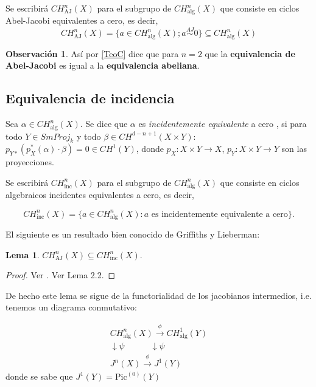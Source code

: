 \documentclass[10pt]{amsart}
\theoremstyle{definition}
\newtheorem{obs}[definition]{Observaci\'on}
\newtheorem{lemma}[definition]{Lema}
\theoremstyle{remark}
\theoremstyle{definition}
\begin{document}
Se escribirá $CH^{n}_{\mathrm{AJ}}(X)$ para el subgrupo de $CH^{n}_{\mathrm{alg}}(X)$ que consiste en ciclos Abel-Jacobi equivalentes a cero, es decir, 
\[ CH_{\mathrm{AJ}}^n(X) = \{ a \in CH^{n}_{\mathrm{alg}}(X); a \stackrel{AJ}{\sim} 0 \} \subseteq CH^{n}_{\mathrm{alg}}(X) \]

\begin{obs}
Así por \ref{TeoC} dice que para $n=2$ que la \textbf{equivalencia de Abel-Jacobi} es igual a la \textbf{equivalencia abeliana}.
\end{obs}

\subsection{Equivalencia de incidencia}\label{EI}
Sea $\alpha\in CH_{\mathrm{alg}}^{n}(X)$. Se dice que $\alpha$ es \textit{incidentemente equivalente} a cero \cite[p. 6-7]{Sam60}, si para todo $Y\in SmProj_{k}$ y todo $\beta\in CH^{d-n+1}(X\times Y)$: $p_{Y*}(p_{X}^{*}(\alpha)\cdot\beta)=0\in CH^{1}(Y)$, donde $p_{X}:X\times Y\to X$, $p_{Y}:X\times Y\to Y$ son las proyecciones.


Se escribirá $CH^{n}_{\mathrm{inc}}(X)$ para el subgrupo de $CH^{n}_{\mathrm{alg}}(X)$ que consiste en ciclos algebraicos incidentes equivalentes a cero, es decir, 

\[
CH^n_{\text{inc}}(X) = \{a \in CH^n_{\mathrm{alg}}(X) : a \text{ es incidentemente equivalente a cero}\}.
\]

El siguiente es un resultado bien conocido de Griffiths y Lieberman:

\begin{lemma}
\(CH^n_{\text{AJ}}(X) \subseteq CH^n_{\text{inc}}(X)\).
\end{lemma}

\begin{proof}
Ver \cite{Mur83}. Ver Lema 2.2.
\end{proof}

De hecho este lema se sigue de la functorialidad de los jacobianos intermedios, i.e. tenemos un diagrama conmutativo:

\[
\begin{array}{c}
    CH^n_\mathrm{alg}(X) \xrightarrow{\phi}  CH^1_\mathrm{alg}(Y) \\
    \downarrow{\psi} \quad\quad\quad \downarrow{\psi} \\
    J^n(X) \xrightarrow{\phi} J^1(Y) 
\end{array}
\]
donde se sabe que $ J^1(Y) = \text{Pic}^{(0)}(Y)$
\end{document}
